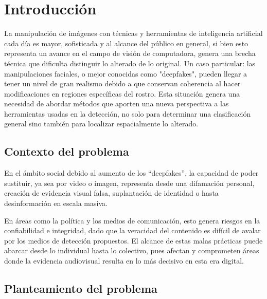 \section{Introducción}


La manipulación de imágenes con técnicas y herramientas de inteligencia artificial cada día es mayor, sofisticada y al alcance del público en general, si bien esto representa un avance en el campo de visión de computadora, genera una brecha técnica que dificulta distinguir lo alterado de lo original. Un caso particular: las manipulaciones faciales, o mejor conocidas como "deepfakes", pueden llegar a tener un nivel de gran realismo debido a que conservan coherencia al hacer modificaciones en regiones específicas del rostro. Esta situación genera una necesidad de abordar métodos que aporten una nueva perspectiva a las herramientas usadas en la detección, no solo para determinar una clasificación general sino también para localizar espacialmente lo alterado.
\subsection{Contexto del problema}

En el ámbito social debido al aumento de los “deepfakes”, la capacidad de poder sustituir, ya sea por video o imagen, representa desde una difamación personal, creación de evidencia visual falsa, suplantación de identidad o hasta desinformación en escala masiva.

En áreas como la política y los medios de comunicación, esto genera riesgos en la confiabilidad  e integridad, dado que la veracidad del contenido es difícil de avalar por los medios de detección propuestos. El alcance de estas malas prácticas puede abarcar desde lo individual hasta lo colectivo, pues afectan y comprometen áreas donde la evidencia audiovisual resulta en lo más decisivo en esta era digital.

\subsection{Planteamiento del problema}

